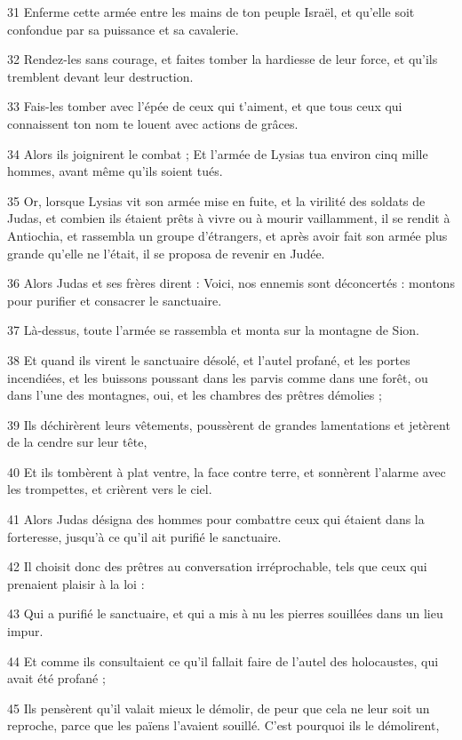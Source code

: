 \par 31 Enferme cette armée entre les mains de ton peuple Israël, et qu'elle soit confondue par sa puissance et sa cavalerie.
\par 32 Rendez-les sans courage, et faites tomber la hardiesse de leur force, et qu'ils tremblent devant leur destruction.
\par 33 Fais-les tomber avec l'épée de ceux qui t'aiment, et que tous ceux qui connaissent ton nom te louent avec actions de grâces.
\par 34 Alors ils joignirent le combat ; Et l'armée de Lysias tua environ cinq mille hommes, avant même qu'ils soient tués.
\par 35 Or, lorsque Lysias vit son armée mise en fuite, et la virilité des soldats de Judas, et combien ils étaient prêts à vivre ou à mourir vaillamment, il se rendit à Antiochia, et rassembla un groupe d'étrangers, et après avoir fait son armée plus grande qu'elle ne l'était, il se proposa de revenir en Judée.
\par 36 Alors Judas et ses frères dirent : Voici, nos ennemis sont déconcertés : montons pour purifier et consacrer le sanctuaire.
\par 37 Là-dessus, toute l'armée se rassembla et monta sur la montagne de Sion.
\par 38 Et quand ils virent le sanctuaire désolé, et l'autel profané, et les portes incendiées, et les buissons poussant dans les parvis comme dans une forêt, ou dans l'une des montagnes, oui, et les chambres des prêtres démolies ;
\par 39 Ils déchirèrent leurs vêtements, poussèrent de grandes lamentations et jetèrent de la cendre sur leur tête,
\par 40 Et ils tombèrent à plat ventre, la face contre terre, et sonnèrent l'alarme avec les trompettes, et crièrent vers le ciel.
\par 41 Alors Judas désigna des hommes pour combattre ceux qui étaient dans la forteresse, jusqu'à ce qu'il ait purifié le sanctuaire.
\par 42 Il choisit donc des prêtres au conversation irréprochable, tels que ceux qui prenaient plaisir à la loi :
\par 43 Qui a purifié le sanctuaire, et qui a mis à nu les pierres souillées dans un lieu impur.
\par 44 Et comme ils consultaient ce qu'il fallait faire de l'autel des holocaustes, qui avait été profané ;
\par 45 Ils pensèrent qu'il valait mieux le démolir, de peur que cela ne leur soit un reproche, parce que les païens l'avaient souillé. C'est pourquoi ils le démolirent,
